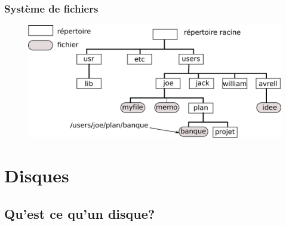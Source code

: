\begin{frame}
\frametitle{Système de fichiers}
\vspace{-0.2cm}
\begin{figure}
  \includegraphics[width=\linewidth]{fig3/file_sys}
\end{figure}
\end{frame}



\section{Disques}

\subsection{Qu'est ce qu'un disque?}

